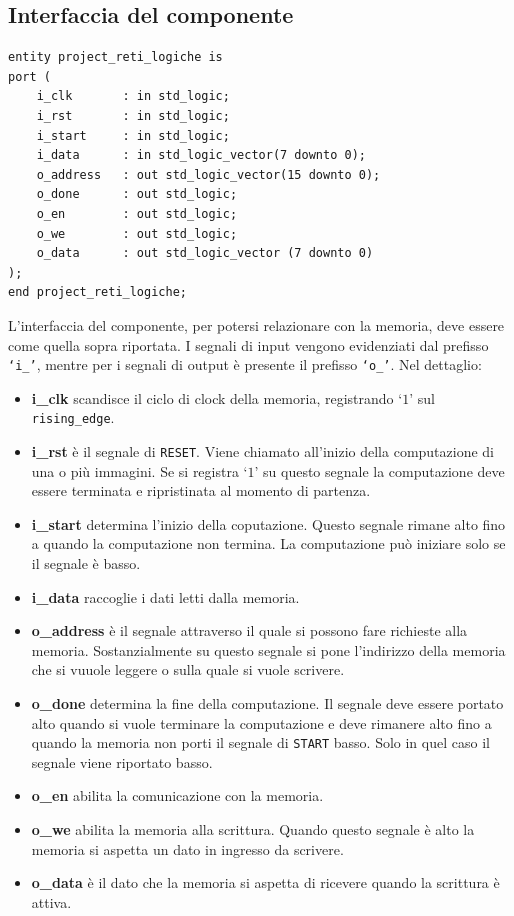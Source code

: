 \documentclass[11pt, a4paper]{article}
\begin{document}
\subsection{Interfaccia del componente}
\begin{lstlisting}
entity project_reti_logiche is
port (
    i_clk       : in std_logic;
    i_rst       : in std_logic;
    i_start     : in std_logic;
    i_data      : in std_logic_vector(7 downto 0);
    o_address   : out std_logic_vector(15 downto 0);
    o_done      : out std_logic;
    o_en        : out std_logic;
    o_we        : out std_logic;
    o_data      : out std_logic_vector (7 downto 0)
);
end project_reti_logiche;
\end{lstlisting}
L'interfaccia del componente, per potersi relazionare con la memoria, deve essere come quella sopra riportata. I segnali di input vengono evidenziati dal prefisso \texttt{\lq i\_'}, mentre per i segnali di output è presente il prefisso \texttt{\lq o\_'}. Nel dettaglio:
\begin{itemize}
  \item \textbf{i\_clk} scandisce il ciclo di clock della memoria, registrando \lq$1$' sul \texttt{rising\_edge}.
  \item \textbf{i\_rst} è il segnale di \texttt{RESET}. Viene chiamato all'inizio della computazione di una o più immagini. Se si registra \lq$1$' su questo segnale la computazione deve essere terminata e ripristinata al momento di partenza.
  \item \textbf{i\_start} determina l'inizio della coputazione. Questo segnale rimane alto fino a quando la computazione non termina. La computazione può iniziare solo se il segnale è basso.
  \item \textbf{i\_data} raccoglie i dati letti dalla memoria.
  \item \textbf{o\_address} è il segnale attraverso il quale si possono fare richieste alla memoria. Sostanzialmente su questo segnale si pone l'indirizzo della memoria che si vuuole leggere o sulla quale si vuole scrivere.
  \item \textbf{o\_done} determina la fine della computazione. Il segnale deve essere portato alto quando si vuole terminare la computazione e deve rimanere alto fino a quando la memoria non porti il segnale di \texttt{START} basso. Solo in quel caso il segnale viene riportato basso.
  \item \textbf{o\_en} abilita la comunicazione con la memoria.
  \item \textbf{o\_we}  abilita la memoria alla scrittura. Quando questo segnale è alto la memoria si aspetta un dato in ingresso da scrivere.
  \item \textbf{o\_data} è il dato che la memoria si aspetta di ricevere quando la scrittura è attiva.
\end{itemize}
\pagebreak
\end{document}
